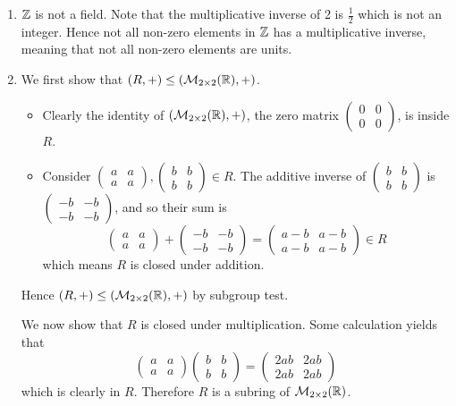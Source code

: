 \begin{enumerate}
    \item $\mathbb{Z}$ is not a field. Note that the multiplicative inverse of 2 is $\frac12$ which is not an integer. Hence not all non-zero elements in $\mathbb{Z}$ has a multiplicative inverse, meaning that not all non-zero elements are units.
    
    \item We first show that $(R, +) \leq (\mathcal{M}_{2\times2}(\mathbb{R}), +)$.
    \begin{itemize}
        \item Clearly the identity of $(\mathcal{M}_{2\times2}(\mathbb{R}), +)$, the zero matrix $\begin{pmatrix}0&0\\0&0\end{pmatrix}$, is inside $R$.
        \item Consider $\begin{pmatrix}a&a\\a&a\end{pmatrix}, \begin{pmatrix}b&b\\b&b\end{pmatrix} \in R$. The additive inverse of $\begin{pmatrix}b&b\\b&b\end{pmatrix}$ is $\begin{pmatrix}-b&-b\\-b&-b\end{pmatrix}$, and so their sum is
        \[
            \begin{pmatrix}a&a\\a&a\end{pmatrix} + \begin{pmatrix}-b&-b\\-b&-b\end{pmatrix} = \begin{pmatrix}a-b&a-b\\a-b&a-b\end{pmatrix} \in R
        \]
        which means $R$ is closed under addition.
    \end{itemize}
    Hence $(R, +) \leq (\mathcal{M}_{2\times2}(\mathbb{R}), +)$ by subgroup test.

    We now show that $R$ is closed under multiplication. Some calculation yields that
    \[
        \begin{pmatrix}a&a\\a&a\end{pmatrix}\begin{pmatrix}b&b\\b&b\end{pmatrix} = \begin{pmatrix}2ab&2ab\\2ab&2ab\end{pmatrix}
    \]
    which is clearly in $R$. Therefore $R$ is a subring of $\mathcal{M}_{2\times2}(\mathbb{R})$.
\end{enumerate}

